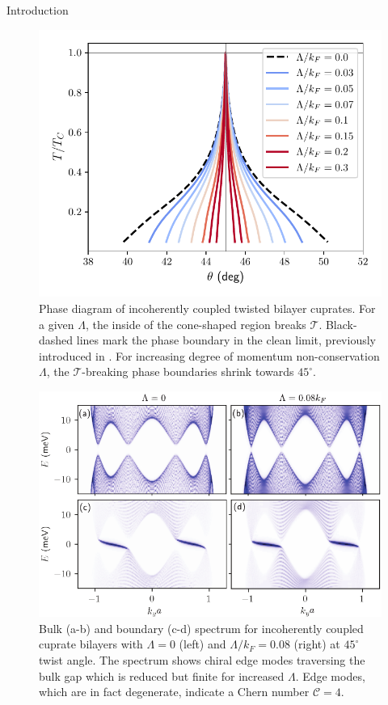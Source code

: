 \documentclass[final]{beamer}
\newlength{\onecolwid}
\begin{document}
\begin{frame}[t]
\begin{columns}[t]
\begin{column}{\onecolwid}
\begin{block}{Introduction}
\begin{figure}[t]
	\centering
	\includegraphics[width=\columnwidth]{fig/phase-diagram.pdf}
	\caption{Phase diagram of incoherently coupled twisted bilayer cuprates. For a given $\Lambda$, the inside of the cone-shaped region breaks $\mathcal{T}$. Black-dashed lines mark the phase boundary in the clean limit, previously introduced in \cite{Can2021}. For increasing degree of momentum non-conservation $\Lambda$, the $\mathcal{T}$-breaking phase boundaries shrink towards $45^\circ$.}
	\label{fig:phasediagram}
\end{figure}
\begin{figure}[t]
	\centering
	\includegraphics[width=\columnwidth]{fig/spectrum.pdf}
	\caption{Bulk (a-b) and boundary (c-d) spectrum for incoherently coupled cuprate bilayers with $\Lambda=0$ (left) and $\Lambda/k_F=0.08$ (right) at $45^\circ$ twist angle. The spectrum shows chiral edge modes traversing the bulk gap which is reduced but finite for increased $\Lambda$. Edge modes, which are in fact degenerate, indicate a Chern number $\mathcal{C}=4$. }
	\label{fig:edgemode}
\end{figure}



\end{block}
\end{column}
\end{columns}
\end{frame}
\end{document}
